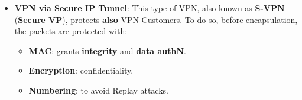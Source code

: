 \begin{itemize}
    \begin{quotebox-red}{Beware}
        However, this protection can be defeated by anybody that \textbf{manages} a router or by Sniffing attacks \(\rightarrow \) protection works for Providers but \textbf{not} for Customers.
    \end{quotebox-red}
    \begin{quotebox-grey}{Example: VPN via IP Tunnel}
    \begin{minipage}{0.6\textwidth}
    \textbf{Net 1} and \textbf{Net 2} have got the \textbf{same color} because they belong to the \textbf{same subnet}.
    This VPN uses IP in IP Tunneling and works in the following way: 
    \begin{enumerate}
        \item \textbf{Node A} from \textbf{Net 1} sends a packet to \textbf{Node B} in \textbf{Net 2}.
        \item . The packet reaches the Border Router \textbf{R1}, which encapsulates it by adding the \textbf{IPv4 Header (Tunnel)}.
        \item The Tunneled Packet is forwarder from \textbf{R1} to \textbf{R2}.
        \item \textbf{R2} decapsulates the packet and forwards it to \textbf{Node 2}.
    \end{enumerate}
    \end{minipage} 
    \hspace{0.2cm}
    \begin{minipage}{0.4\textwidth}
        \centering
        \texttt{[image: /home/lorenzo/Notes/Information System Security/images/Screenshot from 2024-12-30 17-38-10.png]}
    \end{minipage}
    \end{quotebox-grey}
    \item \underline{\textbf{VPN via Secure IP Tunnel}}: This type of VPN, also known as \textbf{S-VPN} (\textbf{Secure VP}), protects \textbf{also} VPN Customers. To
    do so, before encapsulation, the packets are protected with:
    \begin{itemize}
        \item \textbf{MAC}: grants \textbf{integrity} and \textbf{data authN}.
        \item \textbf{Encryption}: confidentiality.
        \item \textbf{Numbering}: to avoid Replay attacks.
    \end{itemize}

\end{itemize}
